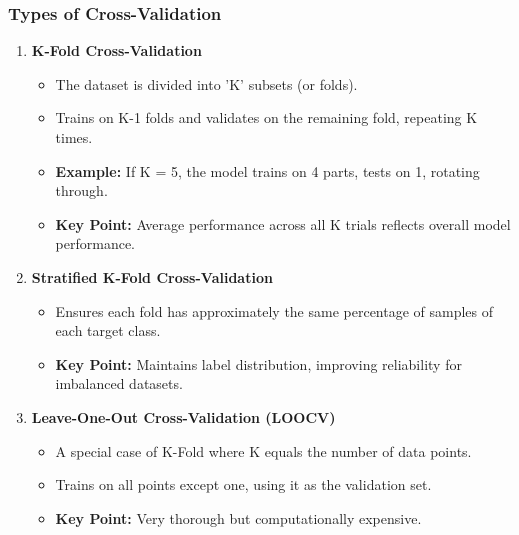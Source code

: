 \documentclass[aspectratio=169]{beamer}
\begin{document}
\begin{frame}[fragile]
    \frametitle{Types of Cross-Validation}
    \begin{enumerate}
        \item \textbf{K-Fold Cross-Validation}
        \begin{itemize}
            \item The dataset is divided into 'K' subsets (or folds).
            \item Trains on K-1 folds and validates on the remaining fold, repeating K times.
            \item \textbf{Example:} If K = 5, the model trains on 4 parts, tests on 1, rotating through.
            \item \textbf{Key Point:} Average performance across all K trials reflects overall model performance.
        \end{itemize}

        \item \textbf{Stratified K-Fold Cross-Validation}
        \begin{itemize}
            \item Ensures each fold has approximately the same percentage of samples of each target class.
            \item \textbf{Key Point:} Maintains label distribution, improving reliability for imbalanced datasets.
        \end{itemize}

        \item \textbf{Leave-One-Out Cross-Validation (LOOCV)}
        \begin{itemize}
            \item A special case of K-Fold where K equals the number of data points.
            \item Trains on all points except one, using it as the validation set.
            \item \textbf{Key Point:} Very thorough but computationally expensive.
        \end{itemize}
    \end{enumerate}
\end{frame}
\end{document}
